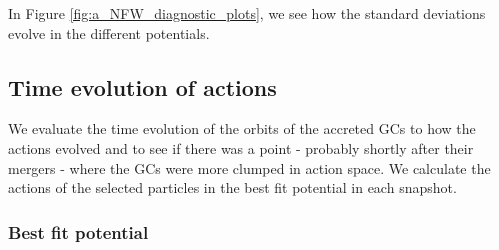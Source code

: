 In Figure \ref{fig:a_NFW_diagnostic_plots}, we see how the standard deviations evolve in the different potentials. 

\subsection{Time evolution of actions}\label{subsec:time_evo_actions}
We evaluate the time evolution of the orbits of the accreted \acp{GC} to how the actions evolved and to see if there was a point - probably shortly after their mergers - where the \acp{GC} were more clumped in action space. We calculate the actions of the selected particles in the best fit potential in each snapshot.  

\subsubsection{Best fit potential}\label{subsubsec:GCs_action_time_right_pot}
